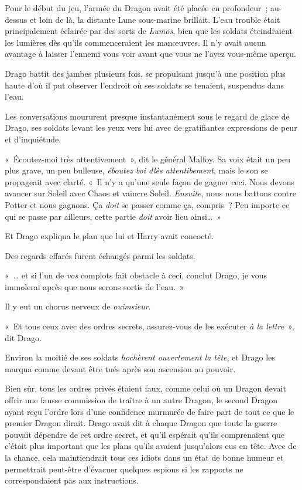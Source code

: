 Pour le début du jeu, l'armée du Dragon avait été placée en profondeur~; au-dessus et loin de là, la distante Lune sous-marine brillait.
L'eau trouble était principalement éclairée par des sorts de \emph{Lumos}, bien que les soldats éteindraient les lumières dès qu'ils commenceraient les manœuvres.
Il n'y avait aucun avantage à laisser l'ennemi vous voir avant que vous ne l'ayez vous-même aperçu.

Drago battit des jambes plusieurs fois, se propulsant jusqu'à une position plus haute d'où il put observer l'endroit où ses soldats se tenaient, suspendus dans l'eau.

Les conversations moururent presque instantanément sous le regard de glace de Drago, ses soldats levant les yeux vers lui avec de gratifiantes expressions de peur et d'inquiétude.

«~Écoutez-moi très attentivement~», dit le général Malfoy.
Sa voix était un peu plus grave, un peu bulleuse, \emph{éboutez boi dlès attentibement}, mais le son se propageait avec clarté.
«~Il n'y a qu'une seule façon de gagner ceci.
Nous devons avancer sur Soleil avec Chaos et vaincre Soleil.
\emph{Ensuite}, nous nous battons contre Potter et nous gagnons.
Ça \emph{doit} se passer comme ça, compris~?
Peu importe ce qui se passe par ailleurs, cette partie \emph{doit} avoir lieu ainsi…~»

Et Drago expliqua le plan que lui et Harry avait concocté.

Des regards effarés furent échangés parmi les soldats.

«~… et si l'un de \emph{vos} complots fait obstacle à ceci, conclut Drago, je vous immolerai après que nous serons sortis de l'eau.~»

Il y eut un chorus nerveux de \emph{ouimsieur}.

«~Et tous ceux avec des ordres secrets, assurez-vous de les exécuter \emph{à la lettre}~», dit Drago.

Environ la moitié de ses soldats \emph{hochèrent ouvertement la tête}, et Drago les marqua comme devant être tués après son ascension au pouvoir.

Bien sûr, tous les ordres privés étaient faux, comme celui où un Dragon devait offrir une fausse commission de traître à un autre Dragon, le second Dragon ayant reçu l'ordre lors d'une confidence murmurée de faire part de tout ce que le premier Dragon dirait.
Drago avait dit à chaque Dragon que toute la guerre pouvait dépendre de cet ordre secret, et qu'il espérait qu'ils comprenaient que c'était plus important que les plans qu'ils avaient jusqu'alors eus en tête.
Avec de la chance, cela maintiendrait tous ces idiots dans un état de bonne humeur et permettrait peut-être d'évacuer quelques espions si les rapports ne correspondaient pas aux instructions.

